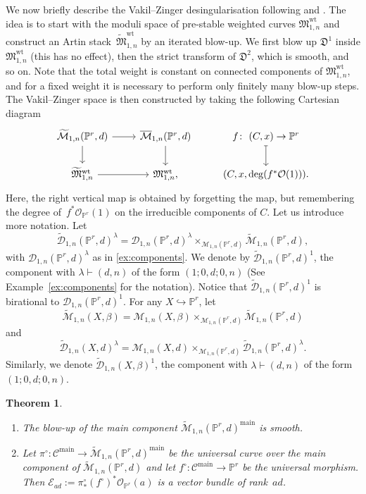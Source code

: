\documentclass[pdftex]{sigma}
\numberwithin{equation}{section}
\newtheorem{Theorem}{Theorem}[section]
\newcommand{\PP}{\mathbb P}
\newcommand{\MM}[4]{\overline{\mathcal M}_{#1,#2}(#3,#4)}
\begin{document}
We now briefly describe the Vakil--Zinger desingularisation following \cite{VZ} and \cite{HL}. The idea is to start with the moduli space of pre-stable weighted curves $\mathfrak M_{1,n}^\text{wt}$ and construct an Artin stack~$\widetilde{\mathfrak M}_{1,n}^\text{wt}$ by an iterated blow-up. We first blow up $\mathfrak D^1$ inside $\mathfrak M_{1,n}^\text{wt}$ (this has no effect), then the strict transform of $\mathfrak D^2$, which is smooth, and so on. Note that the total weight is constant on connected components of $\mathfrak M_{1,n}^\text{wt}$, and for a fixed weight it is necessary to perform only finitely many blow-up steps. The Vakil--Zinger space is then constructed by taking the following Cartesian diagram
\[
 \begin{tikzcd}
 \widetilde{\mathcal M}_{1,n}(\mathbb P^r,d) \ar[r]\ar[d] & \MM{1}{n}{\mathbb P^r}{d} \ar[d] & f\colon \ (C,x)\to\mathbb P^r \ar[d,mapsto] \\
 \widetilde{\mathfrak M}_{1,n}^\text{wt}\ar[r] & \mathfrak M_{1,n}^\text{wt}, & (C,x,\deg(f^*\mathcal O(1))).
 \end{tikzcd}
\]
Here, the right vertical map is obtained by forgetting the map, but remembering the degree of~$f^*\mathcal O_{\mathbb P^r}(1)$ on the irreducible components of $C$.
Let us introduce more notation. Let
\[\widetilde{\mathcal D}_{1,n}(\mathbb P^r,d)^{\lambda}= \mathcal D_{1,n}(\mathbb P^r,d)^{\lambda}\times _{ \mathcal M_{1,n}(\mathbb P^r,d)} \widetilde{\mathcal M}_{1,n}(\mathbb P^r,d),
\]
with $\mathcal D_{1,n}(\mathbb P^r,d)^{\lambda}$ as in \ref{ex:components}. We denote by $ \widetilde{\mathcal D}_{1,n}(\mathbb P^r,d)^1$, the component with $\lambda\vdash(d,n)$ of the form $(1; 0,d; 0,n)$ (See Example~\ref{ex:components} for the notation). Notice that $ \widetilde{\mathcal D}_{1,n}(\mathbb P^r,d)^1$ is birational to $ \mathcal D_{1,n}(\mathbb P^r,d)^1$. For any $X\hookrightarrow \PP^r$, let
\[ \widetilde{\mathcal M}_{1,n}(X,\beta)= \mathcal M_{1,n}(X, \beta)\times_{\mathcal M_{1,n}(\PP^r, d)} \widetilde{\mathcal M}_{1,n}(\mathbb P^r,d)\] and
\[\widetilde{\mathcal D}_{1,n}(X,d)^{\lambda}= \mathcal M_{1,n}(X,d)\times _{ \mathcal M_{1,n}(\mathbb P^r,d)} \widetilde{\mathcal D}_{1,n}(\mathbb P^r,d)^{\lambda}.
\] Similarly, we denote $\widetilde{\mathcal D}_{1,n}(X,\beta)^1$, the component with $\lambda\vdash(d,n)$ of the form $(1; 0,d; 0,n)$.
\begin{Theorem}\quad\begin{enumerate}\itemsep=0pt
\item[$(i)$] The blow-up of the main component $\widetilde{\mathcal {M}}_{1,n}(\mathbb P^r,d)^{\mathrm{main}}$ is smooth.
\item[$(ii)$] Let $\pi^{\circ}\colon \mathcal{C}^{\mathrm{main}}\to\widetilde{\mathcal {M}}_{1,n}(\mathbb P^r,d)^{\mathrm{main}}$ be the universal curve over the main component of $\widetilde{\mathcal {M}}_{1,n}(\mathbb P^r,d)$ and let $f^{\circ}\colon \mathcal{C}^{\mathrm{main}}\to \mathbb P^r$ be the universal morphism. Then $\mathcal{E}_{ad}:=\pi^\circ_* (f^\circ)^*\mathcal O_{\mathbb P^r}(a)$ is a vector bundle of rank~$ad$.
\end{enumerate}
\end{Theorem}
\end{document}
